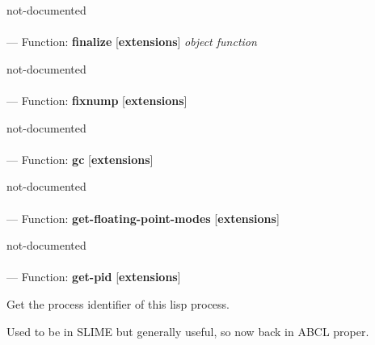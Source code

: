 \begin{adjustwidth}{5em}{5em}
not-documented
\end{adjustwidth}

\paragraph{}
\label{EXTENSIONS:FINALIZE}
--- Function: \textbf{finalize} [\textbf{extensions}] \textit{object function}

\begin{adjustwidth}{5em}{5em}
not-documented
\end{adjustwidth}

\paragraph{}
\label{EXTENSIONS:FIXNUMP}
--- Function: \textbf{fixnump} [\textbf{extensions}] \textit{}

\begin{adjustwidth}{5em}{5em}
not-documented
\end{adjustwidth}

\paragraph{}
\label{EXTENSIONS:GC}
--- Function: \textbf{gc} [\textbf{extensions}] \textit{}

\begin{adjustwidth}{5em}{5em}
not-documented
\end{adjustwidth}

\paragraph{}
\label{EXTENSIONS:GET-FLOATING-POINT-MODES}
--- Function: \textbf{get-floating-point-modes} [\textbf{extensions}] \textit{}

\begin{adjustwidth}{5em}{5em}
not-documented
\end{adjustwidth}

\paragraph{}
\label{EXTENSIONS:GET-PID}
--- Function: \textbf{get-pid} [\textbf{extensions}] \textit{}

\begin{adjustwidth}{5em}{5em}
Get the process identifier of this lisp process. 

Used to be in SLIME but generally useful, so now back in ABCL proper.
\end{adjustwidth}

